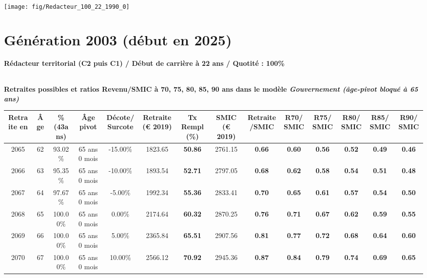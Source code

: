  {\hspace{-2.2cm}\texttt{[image: fig/Redacteur\_100\_22\_1990\_0]}} 

\newpage 
 
\section{Génération 2003 (début en 2025)\label{Redacteur_100_22_2003_0}} 
 
{\bf \noindent Rédacteur territorial (C2 puis C1) / Début de carrière à 22 ans / Quotité : 100\%}  ~ 

 ~\\{\bf \noindent Retraites possibles et ratios Revenu/SMIC à 70, 75, 80, 85, 90 ans dans le modèle \emph{Gouvernement (âge-pivot bloqué à 65 ans)}}  
 
\begin{adjustbox}{max width=\textwidth} 
\begin{tabular}[htb]{|c|c||c|c|c||c|c||c|c||c|c|c|c|c|} 
\hline 
 Retraite en &  Âge &  \%(43ans) &  Âge pivot &  Décote/Surcote &  Retraite (\euro{} 2019) &  Tx Rempl(\%) &  SMIC (\euro{} 2019) &  Retraite/SMIC &  R70/SMIC &  R75/SMIC &  R80/SMIC &  R85/SMIC &  R90/SMIC \\ 
\hline \hline 
 2065 &  62 &  93.02\% &  65 ans 0 mois &  -15.00\% &  1823.65 &  {\bf 50.86} &  2761.15 &  {\bf {\color{red} 0.66}} &  {\bf {\color{red} 0.60}} &  {\bf {\color{red} 0.56}} &  {\bf {\color{red} 0.52}} &  {\bf {\color{red} 0.49}} &  {\bf {\color{red} 0.46}} \\ 
\hline 
 2066 &  63 &  95.35\% &  65 ans 0 mois &  -10.00\% &  1893.54 &  {\bf 52.71} &  2797.05 &  {\bf {\color{red} 0.68}} &  {\bf {\color{red} 0.62}} &  {\bf {\color{red} 0.58}} &  {\bf {\color{red} 0.54}} &  {\bf {\color{red} 0.51}} &  {\bf {\color{red} 0.48}} \\ 
\hline 
 2067 &  64 &  97.67\% &  65 ans 0 mois &  -5.00\% &  1992.34 &  {\bf 55.36} &  2833.41 &  {\bf {\color{red} 0.70}} &  {\bf {\color{red} 0.65}} &  {\bf {\color{red} 0.61}} &  {\bf {\color{red} 0.57}} &  {\bf {\color{red} 0.54}} &  {\bf {\color{red} 0.50}} \\ 
\hline 
 2068 &  65 &  100.00\% &  65 ans 0 mois &  0.00\% &  2174.64 &  {\bf 60.32} &  2870.25 &  {\bf {\color{red} 0.76}} &  {\bf {\color{red} 0.71}} &  {\bf {\color{red} 0.67}} &  {\bf {\color{red} 0.62}} &  {\bf {\color{red} 0.59}} &  {\bf {\color{red} 0.55}} \\ 
\hline 
 2069 &  66 &  100.00\% &  65 ans 0 mois &  5.00\% &  2365.84 &  {\bf 65.51} &  2907.56 &  {\bf {\color{red} 0.81}} &  {\bf {\color{red} 0.77}} &  {\bf {\color{red} 0.72}} &  {\bf {\color{red} 0.68}} &  {\bf {\color{red} 0.64}} &  {\bf {\color{red} 0.60}} \\ 
\hline 
 2070 &  67 &  100.00\% &  65 ans 0 mois &  10.00\% &  2566.12 &  {\bf 70.92} &  2945.36 &  {\bf {\color{red} 0.87}} &  {\bf {\color{red} 0.84}} &  {\bf {\color{red} 0.79}} &  {\bf {\color{red} 0.74}} &  {\bf {\color{red} 0.69}} &  {\bf {\color{red} 0.65}} \\ 
\hline 
\hline 
\end{tabular} 
\end{adjustbox} 
 

